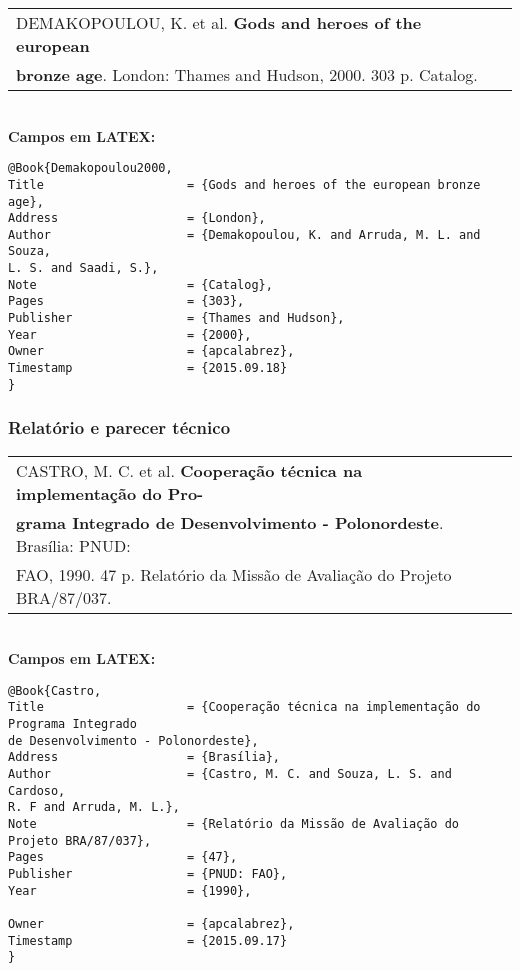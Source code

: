 \begin{tabular}{|l|c|} \hline
DEMAKOPOULOU, K. et al. \textbf{Gods and heroes of the european}\\ \textbf{bronze age}. London:  Thames and Hudson, 2000. 303 p. Catalog.    \\\hline
\end{tabular}\\

\textbf{Campos em LATEX:}

\begin{verbatim}
@Book{Demakopoulou2000,
Title                    = {Gods and heroes of the european bronze age},
Address                  = {London},
Author                   = {Demakopoulou, K. and Arruda, M. L. and Souza,
L. S. and Saadi, S.},
Note                     = {Catalog},
Pages                    = {303},
Publisher                = {Thames and Hudson},
Year                     = {2000},
Owner                    = {apcalabrez},
Timestamp                = {2015.09.18}
}
\end{verbatim}
\subsubsection{Relatório e parecer técnico}

\begin{tabular}{|l|c|} \hline
	CASTRO, M. C. et al. \textbf{Cooperação técnica na implementação do
	Pro-}\\\textbf{grama Integrado de Desenvolvimento - Polonordeste}. Brasília:
	PNUD: \\FAO, 1990. 47 p. Relatório da Missão de Avaliação do Projeto
	BRA/87/037.     \\\hline
\end{tabular}\\

\textbf{Campos em LATEX:}

\begin{verbatim}
@Book{Castro,
Title                    = {Cooperação técnica na implementação do 
Programa Integrado 
de Desenvolvimento - Polonordeste},
Address                  = {Brasília},
Author                   = {Castro, M. C. and Souza, L. S. and Cardoso, 
R. F and Arruda, M. L.},
Note                     = {Relatório da Missão de Avaliação do 
Projeto BRA/87/037},
Pages                    = {47},
Publisher                = {PNUD: FAO},
Year                     = {1990},

Owner                    = {apcalabrez},
Timestamp                = {2015.09.17}
}
\end{verbatim}


